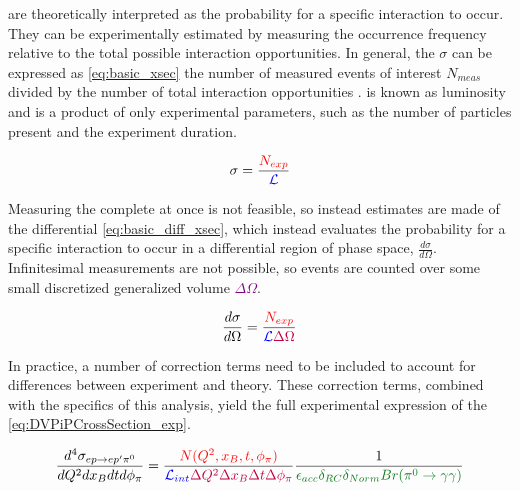 
        \Xsecs are theoretically interpreted as  the probability for a specific interaction to occur. They can be experimentally estimated by measuring the occurrence frequency relative to the total possible interaction opportunities. In general, the \xsec $\sigma$ can be expressed as \eqref{eq:basic_xsec} the number of measured events of interest $N_{meas}$ divided by the number of total interaction opportunities \Lumi. \Lumi is known as luminosity and is a product of only experimental parameters, such as the number of particles present and the experiment duration. 

        \begin{equation} \label{eq:basic_xsec}
            \sigma = \frac{\textcolor{red}{N_{exp}}}{\textcolor{blue}{ \mathcal{L}}}
        \end{equation}
        
        Measuring the complete \xsec at once is not feasible, so instead estimates are made of the differential \xsec \eqref{eq:basic_diff_xsec}, which instead evaluates the probability for a specific interaction to occur in a differential region of phase space, $\frac{d\sigma}{d\Omega}$. Infinitesimal measurements are not possible, so events are counted over some small discretized generalized volume \textcolor{purple}{$\Delta \Omega$}. 
        
        \begin{equation} \label{eq:basic_diff_xsec}
            \frac{d\sigma}{d\Omega} = \frac{ \textcolor{red}{N_{exp}}} {\textcolor{blue}{ \mathcal{L}} \textcolor{purple}{\Delta \Omega}}
        \end{equation}
        
        In practice, a number of correction terms need to be included to account for differences between experiment and theory. These correction terms, combined with the specifics of this analysis, yield the full experimental expression of the \xsec \eqref{eq:DVPiPCrossSection_exp}. 
        
             \begin{equation}\labelAndRemember{eq:DVPiPCrossSection_exp}
                   { \frac{    d^4\sigma_{  ep \rightarrow ep'\pi^0}   } {dQ^2dx_Bdtd\phi_{\pi}} 
                        =   \frac{ \textcolor{red}{ N(Q^2,x_B,t,\phi_{\pi})}} {\Lumiint \textcolor{purple}{ \Delta Q^2 \Delta x_B \Delta t \Delta \phi_{\pi}}} 
                        \frac{1}{\textcolor{correctionfactors}{\epsilon_{acc} \delta_{RC} \delta_{Norm} Br(\pi^0\rightarrow\gamma\gamma)}}}
             \end{equation}      
        
